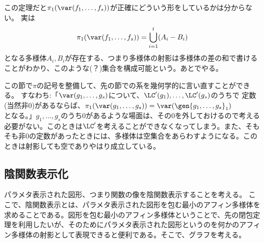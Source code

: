 この定理だと$\pi_1(\var(f_1,\dots,f_s))$が正確にどういう形をしているかは分からない。
実は
\begin{align}
  \pi_1(\var(f_1,\dots,f_s)) = \bigcup_{i=1}^t (A_i - B_i)
\end{align}
となる多様体$A_i,B_i$が存在する、つまり多様体の射影は多様体の差の和で書けることがわかり、このような(？)集合を構成可能という。あとでやる。

この節で$\pi$の記号を整備して、先の節での系を幾何学的に言い直すことができる。
すなわち:「$\var(g_1,\dots,g_s)$について、$\LC'(g_1),\dots,\LC'(g_s)$のうちで
定数(当然非0)があるならば、$\pi_1(\var(g_1,\dots,g_s)) = \var(\gen{g_1,\dots,g_s}_1)$となる。」$g_1,\dots,g_s$のうち0があるような場面は、その0を外しておけるので考える必要がない。このときは$\LC'$を考えることができなくなってしまう。また、そもそも非0の定数があったときには、多様体は空集合をあらわすようになる。このときは射影しても空でありやはり成立している。

\subsection{陰関数表示化}
\label{sub:陰関数表示化}
パラメタ表示された図形、つまり関数の像を陰関数表示することを考える。
ここで、陰関数表示とは、パラメタ表示された図形を包む最小のアフィン多様体を求めることである。図形を包む最小のアフィン多様体ということで、先の閉包定理を利用したいが、そのためにパラメタ表示された図形というのを何かのアフィン多様体の射影として表現できると便利である。そこで、グラフを考える。

